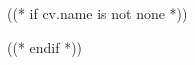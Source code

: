 ((* if cv.name is not none *))
\maketitle
((* endif *))


\let\hrefWithoutArrow\href
\renewcommand{\href}[2]{\hrefWithoutArrow{#1}{\mbox{\color{color1} #2 \raisebox{.15ex}{\footnotesize \faExternalLink*}}}}


